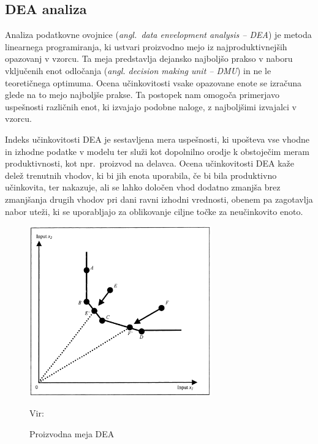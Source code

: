 \documentclass[12pt,a4paper]{article}
\theoremstyle{definition}
\begin{document}
\subsection{DEA analiza}

Analiza podatkovne ovojnice (\emph{angl.\ data envelopment analysis -- DEA}) je 
metoda linearnega programiranja, ki ustvari proizvodno mejo iz 
najproduktivnejših opazovanj v vzorcu. Ta meja predstavlja 
dejansko najboljšo prakso v naboru vključenih enot odločanja
(\emph{angl. decision making unit -- DMU}) in ne le teoretičnega optimuma. Ocena učinkovitosti 
vsake opazovane enote se izračuna glede na to mejo najboljše 
prakse. Ta postopek nam omogoča primerjavo uspešnosti različnih
enot, ki izvajajo podobne naloge, z najboljšimi izvajalci
v vzorcu. \cite{Yaisawarng2002}

Indeks učinkovitosti DEA je sestavljena mera uspešnosti,
ki upošteva vse vhodne in izhodne podatke v modelu ter služi
kot dopolnilno orodje k obstoječim meram produktivnosti,
kot npr.\ proizvod na delavca. Ocena učinkovitosti DEA
kaže delež trenutnih vhodov, ki
bi jih enota uporabila, če bi bila produktivno učinkovita,
ter nakazuje, ali se lahko določen vhod dodatno zmanjša brez
zmanjšanja drugih vhodov pri dani ravni izhodni vrednosti,
obenem pa zagotavlja nabor uteži, ki se uporabljajo za
oblikovanje ciljne točke za neučinkovito enoto. \cite{Yaisawarng2002}


\begin{figure}[htbp]
    \centering
    \includegraphics[width=0.7\textwidth]{dea_frontier.png}
    \caption{Proizvodna meja DEA}
    \label{fig:dea_frontier}
    \vspace{0.2em}
    \footnotesize{Vir: \cite{Lovell2002}}
\end{figure}
\end{document}
